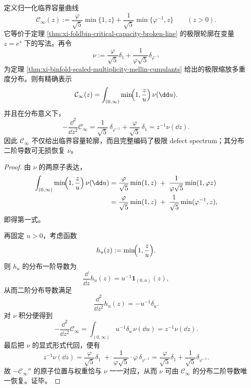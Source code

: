 \begin{theorem}\label{thm:xi-binfold-critical-capacity-defect-atomic-law}
定义归一化临界容量曲线
\[
\mathcal C_\infty(z)
:=
\frac{\varphi}{\sqrt5}\min\{1,z\}
+
\frac{1}{\sqrt5}\min\{\varphi^{-1},z\}
\qquad(z>0).
\]
它等价于定理 \ref{thm:xi-foldbin-critical-capacity-broken-line} 的极限轮廓在变量 \(z=e^s\) 下的写法。再令
\[
\nu
:=
\frac{\varphi}{\sqrt5}\delta_1
+
\frac{1}{\varphi\sqrt5}\delta_{\varphi^{-1}}
\]
为定理 \ref{thm:xi-binfold-scaled-multiplicity-mellin-cumulants} 给出的极限缩放多重度分布。则有精确表示
\[
\mathcal C_\infty(z)
=
\int_{(0,\infty)}\min\!\Bigl(1,\frac{z}{u}\Bigr)\,\nu(\dd u).
\]
并且在分布意义下，
\[
-\frac{\dd^2}{\dd z^2}\mathcal C_\infty
=
\frac{1}{\sqrt5}\,\delta_{\varphi^{-1}}
+
\frac{\varphi}{\sqrt5}\,\delta_1
=
z^{-1}\nu(\dd z).
\]
因此 \(\mathcal C_\infty\) 不仅给出临界容量轮廓，而且完整编码了极限 defect spectrum；其分布二阶导数可无损恢复 \(\nu\)。
\end{theorem}
\begin{proof}
由 \(\nu\) 的两原子表达，
\[
\begin{aligned}
\int_{(0,\infty)}\min\!\Bigl(1,\frac{z}{u}\Bigr)\,\nu(\dd u)
&=
\frac{\varphi}{\sqrt5}\min(1,z)
\;+\;
\frac{1}{\varphi\sqrt5}\min(1,\varphi z)\\
&=
\frac{\varphi}{\sqrt5}\min(1,z)
\;+\;
\frac{1}{\sqrt5}\min(\varphi^{-1},z),
\end{aligned}
\]
即得第一式。

再固定 \(u>0\)，考虑函数
\[
h_u(z):=\min\!\Bigl(1,\frac{z}{u}\Bigr).
\]
则 \(h_u\) 的分布一阶导数为
\[
\frac{\dd}{\dd z}h_u(z)=u^{-1}\mathbf 1_{(0,u)}(z),
\]
从而二阶分布导数满足
\[
\frac{\dd^2}{\dd z^2}h_u(z)=-u^{-1}\delta_u.
\]
对 \(\nu\) 积分便得到
\[
-\frac{\dd^2}{\dd z^2}\mathcal C_\infty
=
\int_{(0,\infty)}u^{-1}\delta_u\,\nu(\dd u)
=
z^{-1}\nu(\dd z).
\]
最后把 \(\nu\) 的显式形式代回，便有
\[
z^{-1}\nu(\dd z)
=
\frac{\varphi}{\sqrt5}\delta_1
\;+\;
\frac{1}{\varphi\sqrt5}\cdot\varphi\,\delta_{\varphi^{-1}}
=
\frac{\varphi}{\sqrt5}\delta_1+\frac{1}{\sqrt5}\delta_{\varphi^{-1}}.
\]
故 \(-\mathcal C_\infty''\) 的原子位置与权重恰与 \(\nu\) 一一对应，从而 \(\nu\) 可由 \(\mathcal C_\infty\) 的分布二阶导数唯一恢复。证毕。
\end{proof}

\endinput
